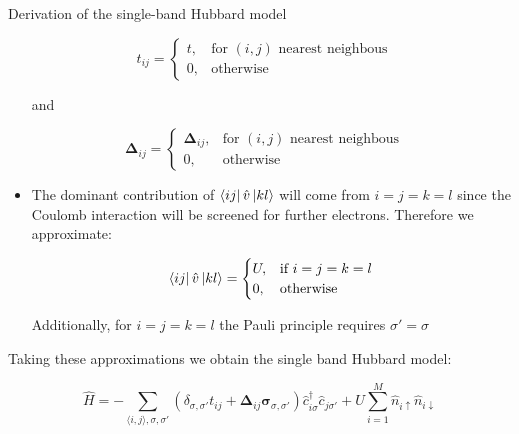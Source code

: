 \begin{section}{Derivation of the single-band Hubbard model}
\begin{itemize}
\begin{equation}
t_{ij} = \begin{cases}
             t,  & \text{for } (i,j) \text{ nearest neighbous} \\
             0,  & \text{otherwise}
       \end{cases} \quad
\end{equation}

and

\begin{equation}
\boldsymbol{\Delta}_{ij} = \begin{cases}
             \boldsymbol{\Delta}_{ij},  & \text{for } (i,j) \text{ nearest neighbous} \\
             0,  & \text{otherwise}
       \end{cases} \quad
\end{equation}

\item The dominant contribution of $\bra{ij} \hat{v} \ket{kl}$ will come from $i=j=k=l$ since the Coulomb interaction will be screened for further electrons. Therefore we approximate:

\begin{equation}
\bra{ij} \hat{v} \ket{kl} =
	\begin{cases}
		U, & \text{if } i=j=k=l \\
		0, & \text{otherwise}
	\end{cases}						
\end{equation}

Additionally, for $i=j=k=l$ the Pauli principle requires $\sigma' = \sigma$

\end{itemize}

Taking these approximations we obtain the single band Hubbard model:

\begin{equation}
\label{Hubbard}
\hat{H} = -\sum_{\langle i,j \rangle, \sigma, \sigma'}(\delta_{\sigma, \sigma'} t_{ij} + \boldsymbol{\Delta}_{ij} \boldsymbol{\sigma}_{\sigma, \sigma'})\hat{c}_{i \sigma}^\dagger \hat{c}_{j \sigma'} + U \sum_{i=1}^M \hat{n}_{i\uparrow}\hat{n}_{i\downarrow}
\end{equation}

\end{section}

